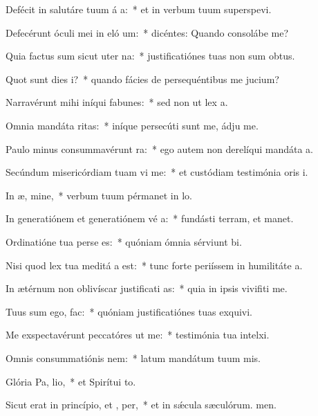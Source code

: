 \item Defécit in salutáre tuum á a:~* et in verbum tuum superspevi.
\item Defecérunt óculi mei in eló um:~* dicéntes: Quando consolábe me?
\item Quia factus sum sicut uter  na:~* justificatiónes tuas non sum obtus.
\item Quot sunt dies  i?~* quando fácies de persequéntibus me jucium?
\item Narravérunt mihi iníqui fabunes:~* sed non ut lex a.
\item Omnia mandáta  ritas:~* iníque persecúti sunt me, ádju me.
\item Paulo minus consummavérunt   ra:~* ego autem non derelíqui mandáta a.
\item Secúndum misericórdiam tuam vi me:~* et custódiam testimónia oris i.
\item In æ, mine,~* verbum tuum pérmanet in lo.
\item In generatiónem et generatiónem vé a:~* fundásti terram, et manet.
\item Ordinatióne tua perse es:~* quóniam ómnia sérviunt bi.
\item Nisi quod lex tua meditá a est:~* tunc forte periíssem in humilitáte a.
\item In ætérnum non oblivíscar justificati as:~* quia in ipsis vivifiti me.
\item Tuus sum ego,   fac:~* quóniam justificatiónes tuas exquivi.
\item Me exspectavérunt peccatóres ut  me:~* testimónia tua intelxi.
\item Omnis consummatiónis  nem:~* latum mandátum tuum mis.
\item Glória Pa,  lio,~* et Spirítui to.
\item Sicut erat in princípio, et ,  per,~* et in sǽcula sæculórum. men.
